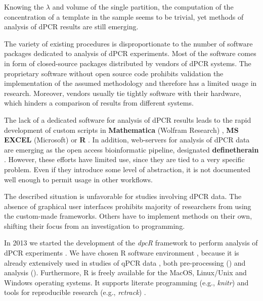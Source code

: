 \documentclass[a4,center,fleqn]{NAR}
\begin{document}
Knowing the $\lambda$ and volume of the single partition, the computation of 
the concentration of a template in the sample seems to be trivial, yet methods 
of analysis of dPCR results are still emerging.

The variety of existing procedures is disproportionate to the number of 
software packages dedicated to analysis of dPCR experiments. Most of the 
software comes in form of closed-source packages distributed by vendors of dPCR 
systems. The proprietary software without open source code prohibits validation 
the implementation of the assumed methodology and therefore has a limited usage 
in research. Moreover, vendors usually tie tightly software with their 
hardware, which hinders a comparison of results from different systems.

The lack of a dedicated software for analysis of dPCR results leads to the rapid 
development of custom scripts in \textbf{Mathematica} (Wolfram Research) 
\cite{strain_highly_2013}, \textbf{MS EXCEL} (Microsoft) 
\cite{dobnik_multiplex_2015} or \textbf{R} \cite{trypsteen_ddpcrquant_2015, 
dreo_optimising_2014}. In addition, web-servers for analysis of dPCR data are 
emerging as the open access bioinformatic pipeline, designated 
\textbf{definetherain} \cite{jones_low_2014}. However, these efforts have 
limited use, since they are tied to a very specific problem. Even if they 
introduce some level of abstraction, it is not documented well enough to 
permit usage in other workflows.

The described situation is unfavorable for studies involving dPCR data. The 
absence of graphical user interfaces prohibits majority of researchers from 
using the custom-made frameworks. Others have to implement methods on their own, 
shifting their focus from an investigation to programming. 

In 2013 we started the development of the \textit{dpcR} framework to perform 
analysis of dPCR experiments \cite{burdukiewicz_dpcr:_2013}. We have chosen R 
software environment \cite{Rcitation}, because it is already extensively used 
in studies of qPCR data \cite{pabinger_survey_2014, rodiger_r_2015}, both 
pre-processing (\cite{roediger2015chippcr, perkins_readqpcr_2012}) and 
analysis (\cite{rodiger_surface_2013, ritz_qpcr_2008}). Furthermore, R is 
freely available for the MacOS, Linux/Unix and Windows operating systems. It 
supports literate programming (e.g., \textit{knitr}) and tools for reproducible 
research (e.g., \textit{rctrack}) \cite{liu_r_2014}. 
\end{document}
